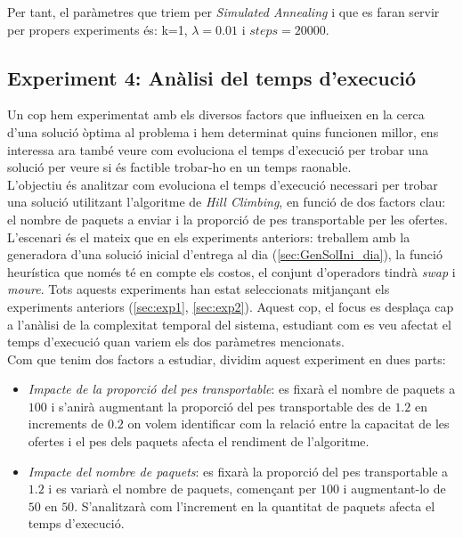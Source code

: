 \documentclass[a4paper]{article}
\begin{document}
	Per tant, el paràmetres que triem per \textit{Simulated Annealing} i que es faran servir per propers experiments és: k=1, $\lambda = 0.01$ i $steps = 20000$.
	

	\subsection{Experiment 4: Anàlisi del temps d'execució}
	\label{sec:exp4}

	Un cop hem experimentat amb els diversos factors que influeixen en la cerca d'una solució òptima al problema i hem determinat quins funcionen millor, ens interessa ara també veure com evoluciona el temps d'execució per trobar una solució per veure si és factible trobar-ho en un temps raonable.\\

	L'objectiu és analitzar com evoluciona el temps d'execució necessari per trobar una solució utilitzant l'algoritme de \textit{Hill Climbing}, en funció de dos factors clau: el nombre de paquets a enviar i la proporció de pes transportable per les ofertes. \\

	L'escenari és el mateix que en els experiments anteriors: treballem amb la generadora d'una solució inicial d'entrega al dia (\ref{sec:GenSolIni_dia}), la funció heurística que només té en compte els costos, el conjunt d'operadors tindrà \textit{swap} i \textit{moure}. Tots aquests experiments han estat seleccionats mitjançant els experiments anteriors (\ref{sec:exp1}, \ref{sec:exp2}). Aquest cop, el focus es desplaça cap a l'anàlisi de la complexitat temporal del sistema, estudiant com es veu afectat el temps d'execució quan variem els dos paràmetres mencionats. \\

	Com que tenim dos factors a estudiar, dividim aquest experiment en dues parts:
	
	\begin{itemize}
		\item \emph{Impacte de la proporció del pes transportable}: es fixarà el nombre de paquets a $100$ i s'anirà augmentant la proporció del pes transportable des de $1.2$ en increments de $0.2$ on volem identificar com la relació entre la capacitat de les ofertes i el pes dels paquets afecta el rendiment de l'algoritme.

		\item \emph{Impacte del nombre de paquets}: es fixarà la proporció del pes transportable a $1.2$ i es variarà el nombre de paquets, començant per $100$ i augmentant-lo de $50$ en $50$. S'analitzarà com l'increment en la quantitat de paquets afecta el temps d'execució.

	\end{itemize}
\end{document}
